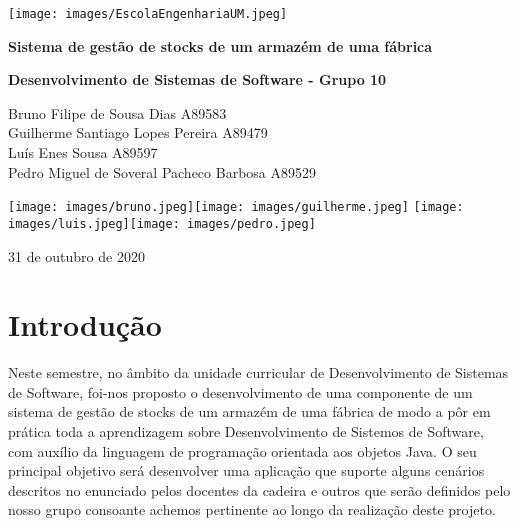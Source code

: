 \documentclass[11pt]{article}
\begin{document}
\begin{titlepage}
   \begin{center}
       
       \texttt{[image: images/EscolaEngenhariaUM.jpeg]}
       
       \vspace*{0.5cm}
       
       \textbf{\Large Sistema de gestão de stocks de um	armazém de uma fábrica}

       \vspace{1.3cm}
       \textbf{\large Desenvolvimento de Sistemas de Software - Grupo 10}
            
       \vspace{1.3cm}

       Bruno Filipe de Sousa Dias A89583\\ Guilherme Santiago Lopes Pereira A89479 \\ Luís Enes Sousa A89597\\ Pedro Miguel de Soveral Pacheco Barbosa A89529

       \vspace{1.5cm}
       
       \texttt{[image: images/bruno.jpeg]}\hspace{0.2cm}\texttt{[image: images/guilherme.jpeg]}
       \vspace{0.15cm}
       \hspace{0.1cm}\texttt{[image: images/luis.jpeg]}\hspace{0.1cm}\texttt{[image: images/pedro.jpeg]}
       
        
        31 de outubro de 2020
            
   \end{center}
\end{titlepage}

\tableofcontents
\thispagestyle{empty}
\cleardoublepage

\setcounter{page}{1}

\section{Introdução}

Neste semestre, no âmbito da unidade curricular de Desenvolvimento de Sistemas de Software, foi-nos proposto o desenvolvimento de uma componente de um sistema de gestão de stocks de um armazém de uma fábrica de modo a pôr em prática toda a aprendizagem sobre Desenvolvimento de Sistemos de Software, com auxílio da linguagem de programação orientada aos objetos Java. O seu principal objetivo será desenvolver uma aplicação que suporte alguns cenários descritos no enunciado pelos docentes da cadeira e outros que serão definidos pelo nosso grupo consoante achemos pertinente ao longo da realização deste projeto.
\end{document}
